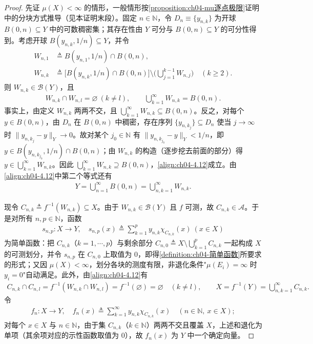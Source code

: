 \documentclass[../../main.tex]{subfiles}%
\begin{document}
\begin{proof}
先证 $\mu(X)<\infty$ 的情形，一般情形按\cref{proposition:ch04-mu逐点极限}证明中的分块方式推导（见本证明末段）。固定 $n\in\mathbb{N}$，令 $D_n\equiv\{y_{n,k}\}$ 为开球 $B(0,n)\subseteq Y$ 中的可数稠密集；其存在性由 $Y$ 可分与 $B(0,n)\subseteq Y$ 的可分性得到。考虑开球 $B(y_{n,k},1/n)\subseteq Y$，并令
\begin{align*}
W_{n,1}&\triangleq B(y_{n,1},1/n)\cap B(0,n),\\
W_{n,k}&\triangleq \big[B(y_{n,k},1/n)\cap B(0,n)\big]\setminus\Big(\bigcup_{j=1}^{k-1}W_{n,j}\Big)\quad(k\geqslant2).
\end{align*}
则 $W_{n,k}\in\mathcal{B}(Y)$，且
\begin{align}
W_{n,k}\cap W_{n,l}=\varnothing\ (k\neq l),\qquad \bigcup_{k=1}^\infty W_{n,k}=B(0,n). \label{align:ch04-4.12}
\end{align}
事实上，由定义 $W_{n,k}$ 两两不交，且 $\bigcup_{k=1}^\infty W_{n,k}\subseteq B(0,n)$。反之，对每个 $y\in B(0,n)$，由 $D_n$ 在 $B(0,n)$ 中稠密，存在序列 $\{y_{n,k_j}\}\subseteq D_n$ 使当 $j\to\infty$ 时 $\|y_{n,k_j}-y\|_Y\to0$。故对某个 $j_0\in\mathbb{N}$ 有 $\|y_{n,k_{j_0}}-y\|_Y<1/n$，即 $y\in B(y_{n,k_{j_0}},1/n)\cap B(0,n)$；由 $W_{n,k}$ 的构造（逐步挖去前面的部分）得 $y\in\bigcup_{k=1}^\infty W_{n,k}$。因此 $\bigcup_{k=1}^\infty W_{n,k}\supseteq B(0,n)$，\eqref{align:ch04-4.12}成立。由\eqref{align:ch04-4.12}中第二个等式还有
\begin{align*}
Y=\bigcup_{n=1}^\infty B(0,n)=\bigcup_{n,k=1}^\infty W_{n,k}.
\end{align*}

现令 $C_{n,k}\triangleq f^{-1}(W_{n,k})\subseteq X$。由于 $W_{n,k}\in\mathcal{B}(Y)$ 且 $f$ 可测，故 $C_{n,k}\in\mathcal{A}$。于是对所有 $n,p\in\mathbb{N}$，函数
\begin{align*}
s_{n,p}:X\to Y,\quad s_{n,p}(x)\triangleq \sum_{k=1}^p y_{n,k}\chi_{C_{n,k}}(x)\ (x\in X)
\end{align*}
为简单函数：把 $C_{n,k}$（$k=1,\cdots ,p$）与剩余部分 $C_{n,0}\triangleq X\setminus\bigcup_{k=1}^pC_{n,k}$ 一起构成 $X$ 的可测划分，并令 $s_{n,p}$ 在 $C_{n,0}$ 上取值为 $0$，即得\cref{definition:ch04-简单函数}所要求的形式；又因 $\mu(X)<\infty$，划分各块的测度有限，非退化条件"$\mu(E_i)=\infty$ 时 $y_i=0$"自动满足。此外，由\eqref{align:ch04-4.12}有
\begin{align*}
C_{n,k}\cap C_{n,l}=f^{-1}(W_{n,k}\cap W_{n,l})=f^{-1}(\varnothing)=\varnothing\quad(k\neq l),\qquad
X=f^{-1}(Y)=\bigcup_{n,k=1}^\infty C_{n,k}.
\end{align*}
令
\begin{align*}
f_n:X\to Y,\quad f_n(x)\triangleq \sum_{k=1}^\infty y_{n,k}\chi_{C_{n,k}}(x)\quad(n\in\mathbb{N},\ x\in X);
\end{align*}
对每个 $x\in X$ 与 $n\in\mathbb{N}$，由于集 $C_{n,k}$（$k\in\mathbb{N}$）两两不交且覆盖 $X$，上述和退化为单项（其余项对应的示性函数取值为 $0$），故 $f_n(x)$ 为 $Y$ 中一个确定向量。


\end{proof}
\end{document}
